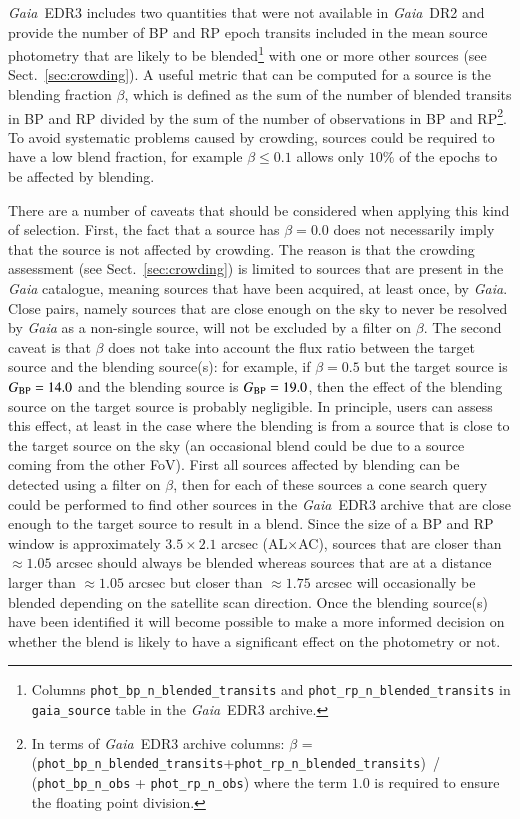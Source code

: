 \documentclass{aa}
\newcommand{\gaia}{\textit{Gaia}\xspace}
\newcommand{\gbp}{\ensuremath{G_{\rm BP}}\xspace}
\newcommand{\drt}{\gaia~DR2\xspace}
\newcommand{\edr}{\gaia~EDR3\xspace}
\newcommand{\xp}{BP and RP\xspace}
\newcommand{\secname}{Sect.}
\newcommand{\secref}[1]{\secname~\ref{sec:#1}}
\begin{document}
\edr includes two quantities that were not available in \drt and provide the number of BP and RP epoch transits included in the mean source photometry that are likely to be blended\footnote{Columns \texttt{phot\_bp\_n\_blended\_transits} and \texttt{phot\_rp\_n\_blended\_transits} in \texttt{gaia\_source} table in the \edr archive.} with one or more other sources (see \secref{crowding}). A useful metric that can be computed for a source is the blending fraction $\beta$, which is defined as the sum of the number of blended transits in \xp divided by the sum of the number of observations in BP and RP\footnote{In terms of \edr archive columns: $\beta$ =\newline
\noindent(\texttt{phot\_bp\_n\_blended\_transits}+\texttt{phot\_rp\_n\_blended\_transits}) \newline {}\,/\,(\texttt{phot\_bp\_n\_obs} + \texttt{phot\_rp\_n\_obs}) where the term $1.0$ is required to ensure the floating point division.}. To avoid systematic problems caused by crowding, sources could be required to have a low blend fraction, for example $\beta\leq0.1$ allows only $10\%$ of the epochs to be affected by blending.

There are a number of caveats that should be considered when applying this kind of selection. First, the fact that a source has $\beta=0.0$ does not necessarily imply that the source is not affected by crowding. The reason is that the crowding assessment (see \secref{crowding}) is limited to sources that are present in the \gaia catalogue, meaning sources that have been acquired, at least once, by \gaia. Close pairs, namely sources that are close enough on the sky to never be resolved by \gaia as a non-single source, will not be excluded by a filter on $\beta$. The second caveat is that $\beta$ does not take into account the flux ratio between the target source and the blending source(s): for example, if $\beta=0.5$ but the target source is $\gbp=14.0$ and the blending source is $\gbp=19.0$, then the effect of the blending source on the target source is probably negligible. In principle, users can assess this effect, at least in the case where the blending is from a source that is close to the target source on the sky (an occasional blend could be due to a source coming from the other FoV). First all sources affected by blending can be detected using a filter on $\beta$, then for each of these sources a cone search query could be performed to find other sources in the \edr archive that are close enough to the target source to result in a blend. Since the size of a \xp window is approximately $3.5\times2.1$ arcsec (AL$\times$AC), sources that are closer than $\approx1.05$ arcsec should always be blended whereas sources that are at a distance larger than $\approx1.05$ arcsec but closer than $\approx1.75$ arcsec will occasionally be blended depending on the satellite scan direction. Once the blending source(s) have been identified it will become possible to make a more informed decision on whether the blend is likely to have a significant effect on the photometry or not.
\end{document}
